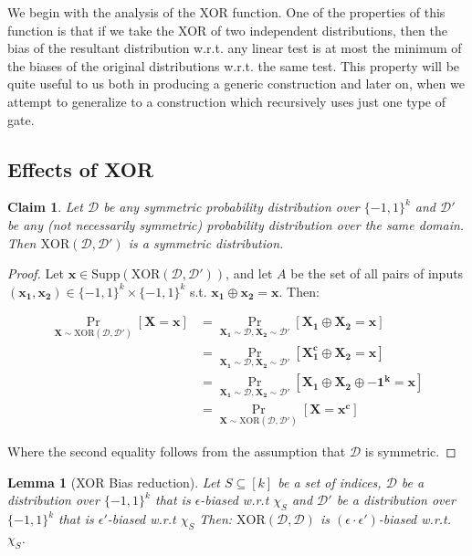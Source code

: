 \documentclass[12pt]{article}
\newtheorem{lemma}[theorem]{Lemma}
\newtheorem{claim}[theorem]{Claim}
\newcommand{\Supp}[1]{\mathrm{Supp}\left(#1\right)}
\newcommand{\oo}[1]{\{-1,1\}^{#1}}
\newcommand{\dist}{\mathcal{D}}
\newcommand{\XOR}{\mathrm{XOR} }
\renewcommand{\vec}[1]{\bm{#1}}
\begin{document}
	We begin with the analysis of the XOR function.
	One of the properties of this function is that if we take the XOR of two independent distributions, then the bias of the resultant distribution w.r.t. any linear test is at most the minimum of the biases of the original distributions w.r.t. the same test.
	This property will be quite useful to us both in producing a generic construction and later on, when we attempt to generalize to a construction which recursively uses just one type of gate.
	
	\subsection{Effects of XOR}
	
	\begin{claim} \label{claim: Symmetry}
		Let $\dist$ be any symmetric probability distribution over $\oo{k}$ and $\dist'$ be any (not necessarily symmetric) probability distribution over the same domain.
		Then $\XOR(\dist,\dist')$ is a symmetric distribution.
	\end{claim}
	
	\begin{proof}
		
		Let $\vec{x} \in \Supp{\XOR(\dist,\dist')}$, and let $A$ be the set of all pairs of inputs $\left(\vec{x_1}, \vec{x_2}\right) \in \oo{k} \times \oo{k}$
		s.t. $\vec{x_1} \oplus \vec{x_2} = \vec{x}$. Then:
		
		\begin{align*}
		\Pr_{\vec{X} \sim \XOR(\dist,\dist')} \left[ \vec{X} = \vec{x} \right]
		&= \Pr_{\vec{X_1} \sim \dist, \vec{X_2} \sim \dist'} \left[ \vec{X_1} \oplus \vec{X_2} = \vec{x} \right] \\
		&= \Pr_{\vec{X_1} \sim \dist, \vec{X_2} \sim \dist'} \left[ \vec{X_1^c} \oplus \vec{X_2} = \vec{x} \right] \\
		&= \Pr_{\vec{X_1} \sim \dist, \vec{X_2} \sim \dist'} \left[ \vec{X_1} \oplus \vec{X_2} \oplus \vec{-1^k} = \vec{x} \right] \\
		&= \Pr_{\vec{X} \sim \XOR(\dist,\dist')} \left[ \vec{X} = \vec{x^c} \right]
		\end{align*}
		
		Where the second equality follows from the assumption that $\dist$ is symmetric.
		
	\end{proof}
	
	\begin{lemma}[XOR Bias reduction] \label{lemma: XOR bias reduction}
		Let $S \subseteq \left[ k \right]$ be a set of indices, $\dist$ be a distribution over $\oo{k}$ that is $\epsilon$-biased w.r.t $\chi_S$ and $\dist'$ be a distribution over $\oo{k}$ that is $\epsilon'$-biased w.r.t $\chi_S$
		Then: $\XOR\left(\dist,\dist\right)$ is $(\epsilon \cdot \epsilon')$-biased w.r.t. $\chi_S$.
	\end{lemma}
	
\end{document}
